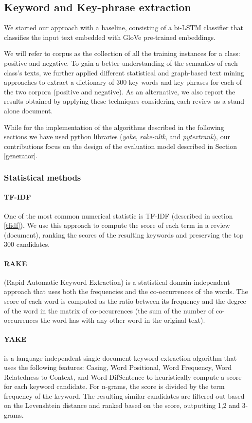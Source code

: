 \subsection{Keyword and Key-phrase extraction} \label{keyword}

We started our approach with a baseline, consisting of a bi-LSTM classifier that classifies the input text embedded with GloVe pre-trained embeddings.

We will refer to corpus as the collection of all the training instances for a class: positive and negative.
To gain a better understanding of the semantics of each class's texts, we further applied different statistical and graph-based text mining approaches to extract a dictionary of 300 key-words and key-phrases for each of the two corpora (positive and negative). As an alternative, we also report the results obtained by applying these techniques considering each review as a stand-alone document.

While for the implementation of the algorithms described in the following sections we have used python libraries (\textit{yake}, \textit{rake-nltk}, and \textit{pytextrank}), our contributions focus on the design of the evaluation model described in Section \ref{generator}. 
\subsubsection{Statistical methods}
\paragraph{TF-IDF}
One of the most common numerical statistic is TF-IDF (described in section \ref{tfidf}). We use this approach to compute the score of each term in a review (document), ranking the scores of the resulting keywords and preserving the top 300 candidates.
\paragraph{RAKE} (Rapid Automatic Keyword Extraction) \cite{rake} is a statistical domain-independent approach that uses both the frequencies and the co-occurrences of the words. The score of each word is computed as the ratio between its frequency and the degree of the word in the matrix of co-occurrences (the sum of the number of co-occurrences the word has with any other word in the original text).    

\paragraph{YAKE} \cite{yake} is a language-independent single document keyword extraction algorithm that uses the following features: Casing, Word Positional, Word Frequency, Word Relatedness to Context, and Word DifSentence to heuristically compute a score for each keyword candidate. For n-grams, the score is divided by the term frequency of the keyword. The resulting similar candidates are filtered out based on the Levenshtein \cite{Levenshtein} distance and ranked based on the score, outputting 1,2 and 3-grams.
